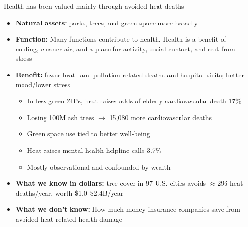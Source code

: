 \documentclass[aspectratio=169]{beamer}
\newcommand{\smallcite}[1]{\begingroup\scriptsize\citep{#1}\endgroup}
\begin{document}
\begin{frame}{Health has been valued mainly through avoided heat deaths}
    \small
    \begin{itemize}
        \item \textbf{Natural assets:} parks, trees, and green space more broadly
        \item \textbf{Function:} Many functions contribute to health. Health is a benefit of cooling, cleaner air, and a place for activity, social contact, and rest from stress \smallcite{jenningsApproachingEnvironmentalHealth2015,keelerSocialecologicalTechnologicalFactors2019}
        \item \textbf{Benefit:} fewer heat- and pollution-related deaths and hospital visits; better mood/lower stress
        \begin{itemize}
            \item In less green ZIPs, heat raises odds of elderly cardiovascular death 17\% \smallcite{gronlundVulnerabilityExtremeHeat2015}
            \item Losing 100M ash trees $\rightarrow$ 15,080 more cardiovascular deaths \smallcite{donovanRelationshipTreesHuman2013}
            \item Green space use tied to better well-being \smallcite{jenningsApproachingEnvironmentalHealth2015}
            \item Heat raises mental health helpline calls 3.7\% \smallcite{janzenTemperatureMentalHealth2025}
            \item Mostly observational and confounded by wealth \smallcite{donovanRelationshipTreesHuman2013,ogletreeRelationshipGreenspaceExposure2023}
        \end{itemize}
        \item \textbf{What we know in dollars:} tree cover in 97 U.S. cities avoids $\approx$296 heat deaths/year, worth \$1.0--\$2.4B/year \smallcite{mcdonaldValueUSUrban2020}
        \item \textbf{What we don't know:} How much money insurance companies save from avoided heat-related health damage
    \end{itemize}
\end{frame}

\end{document}
